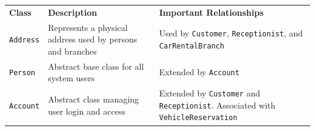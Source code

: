 \begin{center}
{\def\LTcaptype{none} %
\begin{longtable}[]{@{}
>{\centering\arraybackslash} p{}
>{\centering\arraybackslash} p{}
>{\centering\arraybackslash} p{}@{}}
\toprule\noalign{}
\endhead
\bottomrule\noalign{}
\endlastfoot
\begin{minipage}[t]{\linewidth}\centering
\textbf{Class}
\end{minipage} & \begin{minipage}[t]{\linewidth}\centering
\textbf{Description}
\end{minipage} & \begin{minipage}[t]{\linewidth}\centering
\textbf{Important Relationships}
\end{minipage} \\
\begin{minipage}[t]{\linewidth}\centering
\texttt{Address}
\end{minipage} & \begin{minipage}[t]{\linewidth}\centering
Represents a physical address used by persons and branches
\end{minipage} & \begin{minipage}[t]{\linewidth}\centering
Used by \texttt{Customer}, \texttt{Receptionist}, and \texttt{CarRentalBranch}
\end{minipage} \\
\begin{minipage}[t]{\linewidth}\centering
\texttt{Person}
\end{minipage} & \begin{minipage}[t]{\linewidth}\centering
Abstract base class for all system users
\end{minipage} & \begin{minipage}[t]{\linewidth}\centering
Extended by \texttt{Account}
\end{minipage} \\
\begin{minipage}[t]{\linewidth}\centering
\texttt{Account}
\end{minipage} & \begin{minipage}[t]{\linewidth}\centering
Abstract class managing user login and access
\end{minipage} & \begin{minipage}[t]{\linewidth}\centering
Extended by \texttt{Customer} and \texttt{Receptionist}. Associated with \texttt{VehicleReservation}

\end{minipage}
\end{longtable}}
\end{center}
